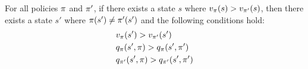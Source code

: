 \begin{corollary}
\label{thm: contra general pit}
    For all policies $\pi$ and $\pi'$,
    if there exists a state $s$ where $v_{\pi}(s) > v_{\pi'}(s)$,
    then there exists a state $s'$ where $\pi(s') \neq \pi'(s')$ 
    and the following conditions hold:
    \vspace{-0.3cm}
    \begin{subequations}
    \label{eq: contra pit}
        \begin{align}
            \label{eq: contra pit sval}
            &v_{\pi}(s') > v_{\pi'}(s')
            \\
            \label{eq: contra pit aval pi}
            &q_{\pi}(s', \pi) > q_{\pi}(s', \pi')
            \\
            \label{eq: contra pit aval pi'}
            &q_{\pi'}(s', \pi) > q_{\pi'}(s', \pi')
        \end{align}
    \end{subequations}
\end{corollary}





